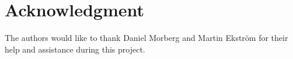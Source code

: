 \section*{Acknowledgment}

The authors would like to thank Daniel Morberg and Martin Ekström for their help and assistance during this project.







